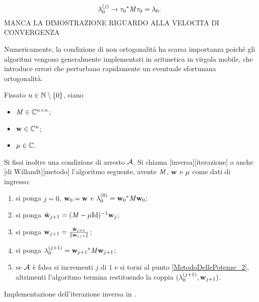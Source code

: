 \[
  \lambda_0^{(j)}
  \rightarrow {\tau_0}^*\mathit{M}\tau_0
  = \lambda_0.
\]
MANCA LA DIMOSTRAZIONE RIGUARDO ALLA VELOCITA DI CONVERGENZA \EndProof
\par Numericamente, la condizione di non ortogonalit\`a ha scarsa importanza
poich\'e gli algoritmi vengono generalmente implementati in aritmetica in
virgola mobile, che introduce errori che perturbano rapidamente un eventuale
sfortunana ortogonalit\`a.
\begin{Definition}
  Fissato $n \in \mathbb{N} \setminus \lbrace 0 \rbrace$, siano
  \begin{itemize}
    \item $\mathit{M} \in \mathbb{C}^{n \times n}$;
    \item $\mathbf{w} \in \mathbb{C}^n$;
    \item $\mu \in \mathbb{C}$.
  \end{itemize}
  Si fissi inoltre una condizione di arresto $\mathcal{A}$.
  Si chiama
  [inversa][iterazione]
  o anche
  [di Willandt][metodo]
  l'algoritmo seguente, avente $\mathit{M}$, $\mathbf{w}$ e $\mu$
  come dati di ingresso:
  \begin{enumerate}
    \item\label{IterazioneInversa_1} si ponga $j = 0$,
      $\mathbf{w}_0 = \mathbf{w}$ e
      $\lambda_0^{(0)} =
        {\mathbf{w}_0}^*\mathit{M}\mathbf{w}_{0}$;
    \item\label{IterazioneInversa_2} si ponga
      $\tilde{\VarVector}_{j + 1}
      = (\Matrix - \VarEigenvalue\Identity)^{-1} \VarVector_j$;
    \item\label{IterazioneInversa_3} si ponga
      $\VarVector_{j + 1}
      = \frac{\tilde{\VarVector}_{j + 1}}{\Norm{\VarVector_{j + 1}}}$;
    \item\label{IterazioneInversa_4} si ponga $\lambda_0^{(j + 1)}
      = {\mathbf{w}_{j + 1}}^*\mathit{M}\mathbf{w}_{j + 1}$;
    \item\label{IterazioneInversa_5} se
      $\mathcal{A}$ \`e falsa
      si incrementi $j$ di $1$ e si torni al punto
      \ref{MetodoDellePotenze_2}, altrimenti l'algoritmo termina
      restituendo la coppia $(\lambda_0^{(j + 1)},\mathbf{w}_{j + 1})$.
  \end{enumerate}
\end{Definition}
\begin{listing}
	\caption{Implementazione dell'iterazione inversa in .}
\end{listing}
